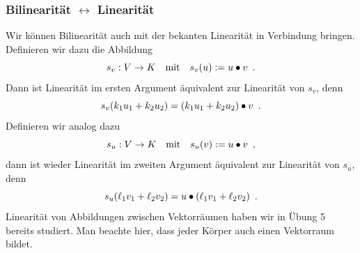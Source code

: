 \documentclass{beamer}
\begin{document}
\begin{frame} \frametitle{Bilinearität $\leftrightarrow$ Linearität}
    \justifying \small
    Wir können Bilinearität auch mit der bekanten Linearität in Verbindung bringen. Definieren wir dazu die Abbildung
    \begin{equation*}
        s_v : V \to K \quad \text{mit} \quad s_v(u) \mathrel{:=} u \bullet v \enskip \text{.}
    \end{equation*}
    Dann ist Linearität im ersten Argument äquivalent zur Linearität von $s_v$, denn
    \begin{equation*}
        s_v(k_1 u_1 + k_2 u_2) = (k_1 u_1 + k_2 u_2) \bullet v \enskip \text{.}
    \end{equation*}
    \pause
    Definieren wir analog dazu
    \begin{equation*}
        s_u : V \to K \quad \text{mit} \quad s_u(v) \mathrel{:=} u \bullet v \enskip \text{,}
    \end{equation*}
    dann ist wieder Linearität im zweiten Argument äquivalent zur Linearität von $s_u$, denn
    \begin{equation*}
        s_u(\ell_1 v_1 + \ell_2 v_2) = u \bullet (\ell_1 v_1 + \ell_2 v_2) \enskip \text{.}
    \end{equation*}
    Linearität von Abbildungen zwischen Vektorräumen haben wir in Übung 5 bereits studiert. Man beachte hier, dass jeder Körper auch einen Vektorraum bildet.
\end{frame}

\end{document}
